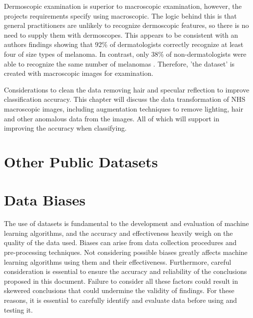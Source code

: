 Dermoscopic examination is superior to macroscopic examination, however, the projects requirements specify using macroscopic. The logic behind this is that general practitioners are unlikely to recognize dermoscopic features, so there is no need to supply them with dermoscopes.  This appears to be consistent with an authors findings showing that 92\% of dermatologists correctly recognize at least four of size types of melanoma. In contrast, only 38\% of non-dermatologists were able to recognize the same number of melanomas \cite{Tae et al. (2019)}. Therefore, 'the dataset' is created with macroscopic images for examination.

Considerations to clean the data removing hair and specular reflection to improve classification accuracy. This chapter will discuss the data transformation of NHS macroscopic images, including augmentation techniques to remove lighting, hair and other anomalous data from the images. All of which will support in improving the accuracy when classifying.



\section{Other Public Datasets}

\section{Data Biases}
The use of datasets is fundamental to the development and evaluation of machine learning algorithms, and the accuracy and effectiveness heavily weigh on the quality of the data used. Biases can arise from data collection procedures and pre-processing techniques. Not considering possible biases greatly affects machine learning algorithms using them and their effectiveness. Furthermore, careful consideration is essential to ensure the accuracy and reliability of the conclusions proposed in this document. Failure to consider all these factors could result in skewered conclusions that could undermine the validity of findings. For these reasons, it is essential to carefully identify and evaluate data before using and testing it.

